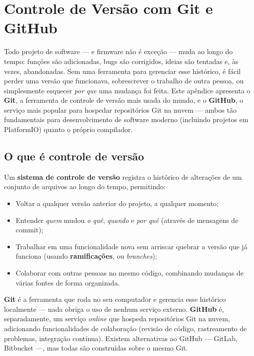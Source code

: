 \chapter{Controle de Versão com Git e GitHub}
\label{ap:git}

Todo projeto de software — e firmware não é exceção — muda ao longo do tempo: funções são adicionadas, bugs são corrigidos, ideias são tentadas e, às vezes, abandonadas. Sem uma ferramenta para gerenciar esse histórico, é fácil perder uma versão que funcionava, sobrescrever o trabalho de outra pessoa, ou simplesmente esquecer \emph{por que} uma mudança foi feita. Este apêndice apresenta o \textbf{Git}, a ferramenta de controle de versão mais usada do mundo, e o \textbf{GitHub}, o serviço mais popular para hospedar repositórios Git na nuvem — ambos tão fundamentais para desenvolvimento de software moderno (incluindo projetos em PlatformIO) quanto o próprio compilador.

\section{O que é controle de versão}

Um \textbf{sistema de controle de versão} registra o histórico de alterações de um conjunto de arquivos ao longo do tempo, permitindo:

\begin{itemize}
    \item Voltar a qualquer versão anterior do projeto, a qualquer momento;
    \item Entender \emph{quem} mudou \emph{o quê}, \emph{quando} e \emph{por quê} (através de mensagens de commit);
    \item Trabalhar em uma funcionalidade nova sem arriscar quebrar a versão que já funciona (usando \textbf{ramificações}, ou \emph{branches});
    \item Colaborar com outras pessoas no mesmo código, combinando mudanças de várias fontes de forma organizada.
\end{itemize}

\begin{nota}
\textbf{Git} é a ferramenta que roda no seu computador e gerencia esse histórico localmente — nada obriga o uso de nenhum serviço externo. \textbf{GitHub} é, separadamente, um serviço \emph{online} que hospeda repositórios Git na nuvem, adicionando funcionalidades de colaboração (revisão de código, rastreamento de problemas, integração contínua). Existem alternativas ao GitHub — GitLab, Bitbucket —, mas todas são construídas sobre o mesmo Git.
\end{nota}

